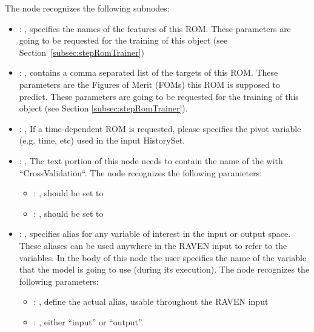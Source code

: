   The  node recognizes the following subnodes:
  \begin{itemize}
    \item {}: , 
      specifies the names of the features of this ROM.         \nb These parameters are going to be
      requested for the training of this object         (see Section~\ref{subsec:stepRomTrainer})

    \item {}: , 
      contains a comma separated list of the targets of this ROM. These parameters         are the
      Figures of Merit (FOMs) this ROM is supposed to predict.         \nb These parameters are
      going to be requested for the training of this         object (see Section
      \ref{subsec:stepRomTrainer}).

    \item {}: , 
      If a time-dependent ROM is requested, please specifies the pivot         variable (e.g. time,
      etc) used in the input HistorySet.

    \item {}: , 
      The text portion of this node needs to contain the name of the  with
               ``CrossValidation``.
      The  node recognizes the following parameters:
        \begin{itemize}
          \item {}: , 
            should be set to 
          \item {}: , 
            should be set to 
      \end{itemize}

    \item {}: , 
      specifies alias for         any variable of interest in the input or output space. These
      aliases can be used anywhere in the RAVEN input to         refer to the variables. In the body
      of this node the user specifies the name of the variable that the model is going to use
      (during its execution).
      The  node recognizes the following parameters:
        \begin{itemize}
          \item {}: , 
            define the actual alias, usable throughout the RAVEN input
          \item {}: , 
            either ``input'' or ``output''.
      \end{itemize}


\end{itemize}
